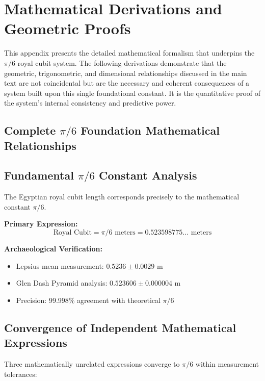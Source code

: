 \documentclass[11pt]{article}
\begin{document}






\appendix
\section{Mathematical Derivations and Geometric Proofs}

This appendix presents the detailed mathematical formalism that underpins the $\pi/6$ royal cubit system. The following derivations demonstrate that the geometric, trigonometric, and dimensional relationships discussed in the main text are not coincidental but are the necessary and coherent consequences of a system built upon this single foundational constant. It is the quantitative proof of the system's internal consistency and predictive power.

\subsection{Complete \texorpdfstring{$\pi/6$}{pi/6} Foundation Mathematical Relationships}

\subsection{Fundamental \texorpdfstring{$\pi/6$}{pi/6} Constant Analysis}
The Egyptian royal cubit length corresponds precisely to the mathematical constant $\pi/6$.

\textbf{Primary Expression:}
\[ \text{Royal Cubit} = \pi/6 \text{ meters} = 0.523598775... \text{ meters} \]

\textbf{Archaeological Verification:}
\begin{itemize}
    \item Lepsius mean measurement: $0.5236 \pm 0.0029$ m
    \item Glen Dash Pyramid analysis: $0.523606 \pm 0.000004$ m
    \item Precision: 99.998\% agreement with theoretical $\pi/6$
\end{itemize}

\subsection{Convergence of Independent Mathematical Expressions}
Three mathematically unrelated expressions converge to $\pi/6$ within measurement tolerances:
\end{document}
